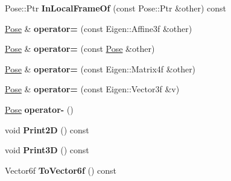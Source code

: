 \begin{DoxyCompactItemize}
\item 
\hypertarget{classdepth__clustering_1_1Pose_a487075b7789f9f6064f136cf716480c2}{Pose\-::\-Ptr {\bfseries In\-Local\-Frame\-Of} (const Pose\-::\-Ptr \&other) const }\label{classdepth__clustering_1_1Pose_a487075b7789f9f6064f136cf716480c2}

\item 
\hypertarget{classdepth__clustering_1_1Pose_a79aad7062818ef15d006b2fd9b3b1d32}{\hyperlink{classdepth__clustering_1_1Pose}{Pose} \& {\bfseries operator=} (const Eigen\-::\-Affine3f \&other)}\label{classdepth__clustering_1_1Pose_a79aad7062818ef15d006b2fd9b3b1d32}

\item 
\hypertarget{classdepth__clustering_1_1Pose_a05bd18a5e4c30f345b3a18de0274d6e2}{\hyperlink{classdepth__clustering_1_1Pose}{Pose} \& {\bfseries operator=} (const \hyperlink{classdepth__clustering_1_1Pose}{Pose} \&other)}\label{classdepth__clustering_1_1Pose_a05bd18a5e4c30f345b3a18de0274d6e2}

\item 
\hypertarget{classdepth__clustering_1_1Pose_ad753de7d1d9d6e3923f352820a0a8be0}{\hyperlink{classdepth__clustering_1_1Pose}{Pose} \& {\bfseries operator=} (const Eigen\-::\-Matrix4f \&other)}\label{classdepth__clustering_1_1Pose_ad753de7d1d9d6e3923f352820a0a8be0}

\item 
\hypertarget{classdepth__clustering_1_1Pose_abda699c75125980c1d3dab5cde5a1881}{\hyperlink{classdepth__clustering_1_1Pose}{Pose} \& {\bfseries operator=} (const Eigen\-::\-Vector3f \&v)}\label{classdepth__clustering_1_1Pose_abda699c75125980c1d3dab5cde5a1881}

\item 
\hypertarget{classdepth__clustering_1_1Pose_a885967b7ce945d7916c14664c6f5da5f}{\hyperlink{classdepth__clustering_1_1Pose}{Pose} {\bfseries operator-\/} ()}\label{classdepth__clustering_1_1Pose_a885967b7ce945d7916c14664c6f5da5f}

\item 
\hypertarget{classdepth__clustering_1_1Pose_a52abdfbebc7bf1bce613ec78bbd5cd34}{void {\bfseries Print2\-D} () const }\label{classdepth__clustering_1_1Pose_a52abdfbebc7bf1bce613ec78bbd5cd34}

\item 
\hypertarget{classdepth__clustering_1_1Pose_a32a474870eae047296a03f02e1b82c23}{void {\bfseries Print3\-D} () const }\label{classdepth__clustering_1_1Pose_a32a474870eae047296a03f02e1b82c23}

\item 
\hypertarget{classdepth__clustering_1_1Pose_acd2c3cfe057b9f905ddf2eb986f0435c}{Vector6f {\bfseries To\-Vector6f} () const }\label{classdepth__clustering_1_1Pose_acd2c3cfe057b9f905ddf2eb986f0435c}

\end{DoxyCompactItemize}

